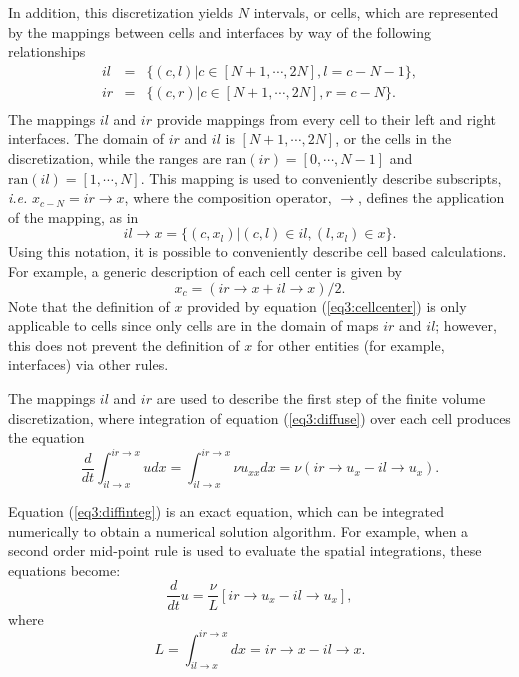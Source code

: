 \documentclass[10pt,epsf]{book}
\begin{document}
In addition, this discretization yields $N$ intervals, or cells, which
are represented by the mappings between cells and interfaces by way of
the following relationships
\begin{equation}
\begin{array}{rcl}
il & = & \lbrace (c,l) | c \in [N+1, \cdots, 2N], l = c-N-1 \rbrace,\\
ir & = & \lbrace (c,r) | c \in [N+1, \cdots, 2N], r = c-N \rbrace.\\
\end{array}
\label{eq3:cellmaps}
\end{equation}
The mappings $il$ and $ir$ provide mappings from every cell to their
left and right interfaces.  The domain of $ir$ and $il$ is $[N+1,
\cdots, 2N]$, or the cells in the discretization, while the ranges are
$\mathrm{ran}(ir) = [0, \cdots, N-1]$ and $\mathrm{ran}(il) = [1, \cdots, N]$.  This
mapping is used to conveniently describe subscripts, {\it i.e.}
$x_{c-N} = ir \rightarrow x$, where the composition operator,
$\rightarrow$, defines the application of the mapping, as in
\begin{equation}
il\rightarrow x = \lbrace (c,x_l) | (c,l) \in il, (l,x_l) \in x \rbrace.
\end{equation}
Using this notation, it is possible to conveniently describe cell
based calculations.  For example, a generic description of each cell
center is given by
\begin{equation}
\label{eq3:cellcenter}
x_c = (ir \rightarrow x + il \rightarrow x)/2.
\end{equation}
Note that the definition of $x$ provided by equation
(\ref{eq3:cellcenter}) is only applicable to cells since only cells are in
the domain of maps $ir$ and $il$; however, this does not prevent the
definition of $x$ for other entities (for example, interfaces) via
other rules.

The mappings $il$ and $ir$ are used to describe the first
step of the finite volume discretization, where integration of
equation (\ref{eq3:diffuse}) over each cell produces the equation
\begin{equation}
\frac{d}{dt} \int_{il \rightarrow x}^{ir \rightarrow x} u dx
 =  \int_{il \rightarrow x}^{ir \rightarrow x} \nu u_{xx} dx = \nu(ir \rightarrow u_x - il \rightarrow u_x) .
\label{eq3:diffinteg}
\end{equation}

Equation (\ref{eq3:diffinteg}) is an exact equation, which can be
integrated numerically to obtain a numerical solution algorithm.
For example, when a second order mid-point rule is used to evaluate the spatial
integrations, these equations become:
\begin{equation}
\frac{d}{dt} u = \frac{\nu}{L}
\left[ {ir \rightarrow u_x - il \rightarrow u_x} \right],
\label{eq3:fvm}
\end{equation}
where 
\begin{equation}
L = \int_{il \rightarrow x}^{ir \rightarrow x} dx = ir \rightarrow x - il \rightarrow x.
\label{eq3:length}
\end{equation}
\end{document}
